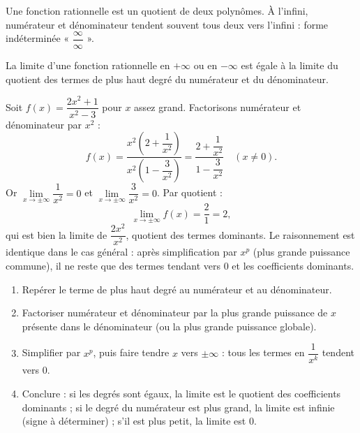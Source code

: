 \documentclass[11pt]{article}
\newcommand{\cle}[1]{{\popxbold\color{popdark}#1}}
\begin{document}
Une \cle{fonction rationnelle} est un quotient de deux polynômes. À l'infini, numérateur et dénominateur tendent souvent tous deux vers l'infini : forme indéterminée « $\dfrac{\infty}{\infty}$ ».

\begin{propriete}
La limite d'une fonction rationnelle en $+\infty$ ou en $-\infty$ est égale à la limite du \cle{quotient des termes de plus haut degré} du numérateur et du dénominateur.
\end{propriete}

\begin{experience}
Soit $f(x) = \dfrac{2x^2 + 1}{x^2 - 3}$ pour $x$ assez grand. Factorisons numérateur et dénominateur par $x^2$ :
\[ f(x) = \frac{x^2\left(2 + \dfrac{1}{x^2}\right)}{x^2\left(1 - \dfrac{3}{x^2}\right)} = \frac{2 + \dfrac{1}{x^2}}{1 - \dfrac{3}{x^2}} \quad (x \neq 0). \]
Or $\lim\limits_{x \to \pm\infty} \dfrac{1}{x^2} = 0$ et $\lim\limits_{x \to \pm\infty} \dfrac{3}{x^2} = 0$. Par quotient :
\[ \lim_{x \to \pm\infty} f(x) = \frac{2}{1} = 2, \]
qui est bien la limite de $\dfrac{2x^2}{x^2}$, quotient des termes dominants. Le raisonnement est identique dans le cas général : après simplification par $x^p$ (plus grande puissance commune), il ne reste que des termes tendant vers $0$ et les coefficients dominants.
\end{experience}

\begin{methode}
\begin{enumerate}
\item Repérer le terme de plus haut degré au numérateur et au dénominateur.
\item Factoriser numérateur et dénominateur par la plus grande puissance de $x$ présente dans le dénominateur (ou la plus grande puissance globale).
\item Simplifier par $x^p$, puis faire tendre $x$ vers $\pm\infty$ : tous les termes en $\dfrac{1}{x^k}$ tendent vers $0$.
\item Conclure : si les degrés sont égaux, la limite est le quotient des coefficients dominants ; si le degré du numérateur est plus grand, la limite est infinie (signe à déterminer) ; s'il est plus petit, la limite est $0$.
\end{enumerate}
\end{methode}
\end{document}
